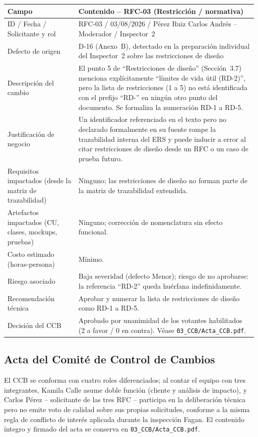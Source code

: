 \documentclass[11pt,a4paper]{article}
\begin{document}
\begin{longtable}{|p{4.5cm}|p{9.5cm}|}
\hline
\textbf{Campo} & \textbf{Contenido -- RFC-03 (Restricción / normativa)} \\
\hline
ID / Fecha / Solicitante y rol & RFC-03 / 03/08/2026 / Pérez Ruiz Carlos Andrés -- Moderador / Inspector~2 \\
\hline
Defecto de origen & D-16 (Anexo~B), detectado en la preparación individual del Inspector~2 sobre las restricciones de diseño \\
\hline
Descripción del cambio & El punto 5 de ``Restricciones de diseño'' (Sección~3.7) menciona explícitamente ``límites de vida útil (RD-2)'', pero la lista de restricciones (1 a 5) no está identificada con el prefijo ``RD-'' en ningún otro punto del documento. Se formaliza la numeración RD-1 a RD-5. \\
\hline
Justificación de negocio & Un identificador referenciado en el texto pero no declarado formalmente en su fuente rompe la trazabilidad interna del ERS y puede inducir a error al citar restricciones de diseño desde un RFC o un caso de prueba futuro. \\
\hline
Requisitos impactados (desde la matriz de trazabilidad) & Ninguno; las restricciones de diseño no forman parte de la matriz de trazabilidad extendida. \\
\hline
Artefactos impactados (CU, clases, mockups, pruebas) & Ninguno; corrección de nomenclatura sin efecto funcional. \\
\hline
Costo estimado (horas-persona) & Mínimo. \\
\hline
Riesgo asociado & Baja severidad (defecto Menor); riesgo de no aprobarse: la referencia ``RD-2'' queda huérfana indefinidamente. \\
\hline
Recomendación técnica & Aprobar y numerar la lista de restricciones de diseño como RD-1 a RD-5. \\
\hline
Decisión del CCB & Aprobado por unanimidad de los votantes habilitados (2 a favor / 0 en contra). Véase \texttt{03\_CCB/Acta\_CCB.pdf}. \\
\hline
\end{longtable}

\subsection{Acta del Comité de Control de Cambios}
El CCB se conforma con cuatro roles diferenciados; al contar el equipo con tres integrantes, Kamila Calle asume doble función (cliente y análisis de impacto), y Carlos Pérez -- solicitante de las tres RFC -- participa en la deliberación técnica pero no emite voto de calidad sobre sus propias solicitudes, conforme a la misma regla de conflicto de interés aplicada durante la inspección Fagan. El contenido íntegro y firmado del acta se conserva en \texttt{03\_CCB/Acta\_CCB.pdf}.
\end{document}
